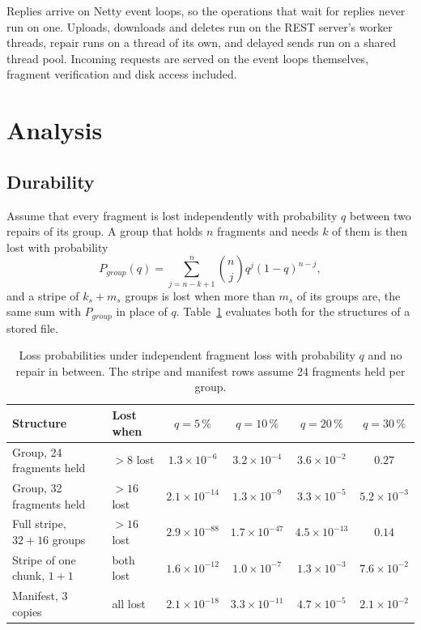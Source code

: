 \documentclass[10pt,a4paper,final]{article}
\begin{document}
Replies arrive on Netty event loops, so the operations that wait for replies never run on one. Uploads, downloads
and deletes run on the REST server's worker threads, repair runs on a thread of its own, and delayed sends run on a
shared thread pool. Incoming requests are served on the event loops themselves, fragment verification and disk
access included.

\section{Analysis}
\label{sec:analysis}

\subsection{Durability}
\label{sec:durability}

Assume that every fragment is lost independently with probability $q$ between two repairs of its group. A group
that holds $n$ fragments and needs $k$ of them is then lost with probability
\begin{equation}
	P_{\mathit{group}}(q) = \sum_{j = n - k + 1}^{n} \binom{n}{j} q^j (1 - q)^{n - j} ,
\end{equation}
and a stripe of $k_s + m_s$ groups is lost when more than $m_s$ of its groups are, the same sum with
$P_{\mathit{group}}$ in place of $q$. Table~\ref{tab:loss} evaluates both for the structures of a stored file.

\begin{table}[H]
\centering
\small
\begin{tabular}{@{}llcccc@{}}
\toprule
Structure & Lost when & $q = 5\,\%$ & $q = 10\,\%$ & $q = 20\,\%$ & $q = 30\,\%$ \\
\midrule
Group, 24 fragments held & $> 8$ lost & $1.3 \times 10^{-6}$ & $3.2 \times 10^{-4}$ & $3.6 \times 10^{-2}$ &
$0.27$ \\
Group, 32 fragments held & $> 16$ lost & $2.1 \times 10^{-14}$ & $1.3 \times 10^{-9}$ & $3.3 \times 10^{-5}$ &
$5.2 \times 10^{-3}$ \\
Full stripe, $32 + 16$ groups & $> 16$ lost & $2.9 \times 10^{-88}$ & $1.7 \times 10^{-47}$ & $4.5 \times
10^{-13}$ & $0.14$ \\
Stripe of one chunk, $1 + 1$ & both lost & $1.6 \times 10^{-12}$ & $1.0 \times 10^{-7}$ & $1.3 \times 10^{-3}$ &
$7.6 \times 10^{-2}$ \\
Manifest, 3 copies & all lost & $2.1 \times 10^{-18}$ & $3.3 \times 10^{-11}$ & $4.7 \times 10^{-5}$ & $2.1 \times
10^{-2}$ \\
\bottomrule
\end{tabular}
\caption{Loss probabilities under independent fragment loss with probability $q$ and no repair in between. The
stripe and manifest rows assume 24 fragments held per group.}
\label{tab:loss}
\end{table}
\end{document}
